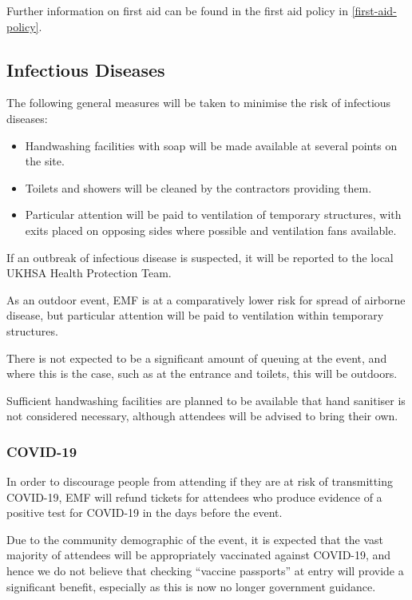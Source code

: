 Further information on first aid can be found in the first aid policy in
\cref{first-aid-policy}.

\subsection{Infectious Diseases}

The following general measures will be taken to minimise the risk of infectious diseases:
\begin{itemize}
    \tightlist
    \item Handwashing facilities with soap will be made available at several points on the site.
    \item Toilets and showers will be cleaned by the contractors providing them.
    \item Particular attention will be paid to ventilation of temporary structures, with
            exits placed on opposing sides where possible and ventilation fans available.
\end{itemize}

If an outbreak of infectious disease is suspected, it will be reported to the local
UKHSA Health Protection Team.

As an outdoor event, EMF is at a comparatively lower risk for spread of airborne disease,
but particular attention will be paid to ventilation within temporary structures.

There is not expected to be a significant amount of queuing at the event, and where this is
the case, such as at the entrance and toilets, this will be outdoors.

Sufficient handwashing facilities are planned to be available that hand sanitiser is not
considered necessary, although attendees will be advised to bring their own.

\subsubsection{COVID-19}

In order to discourage people from attending if they are at risk of transmitting COVID-19,
EMF will refund tickets for attendees who produce evidence of a positive test for COVID-19
in the days before the event.

Due to the community demographic of the event, it is expected that the vast majority of
attendees will be appropriately vaccinated against COVID-19, and hence we do not believe
that checking ``vaccine passports'' at entry will provide a significant benefit, especially
as this is now no longer government guidance.

